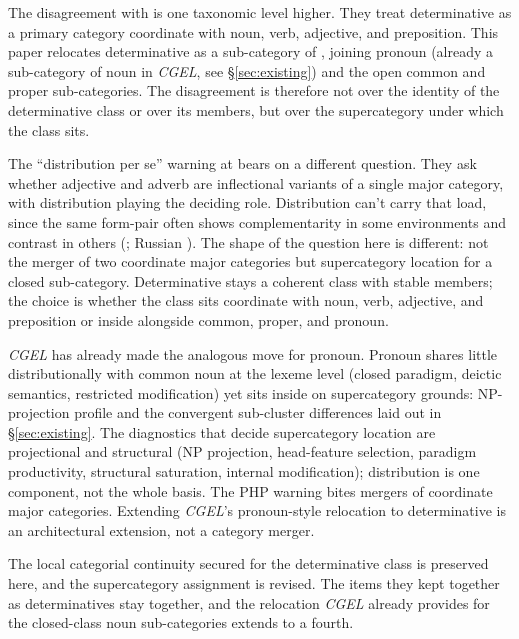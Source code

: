 \documentclass[12pt]{article}
\begin{document}
The disagreement with \textcite{payne2010} is one taxonomic level higher. They treat determinative as a primary category coordinate with noun, verb, adjective, and preposition. This paper relocates determinative as a sub-category of , joining pronoun (already a sub-category of noun in \textit{CGEL}, see §\ref{sec:existing}) and the open common and proper sub-categories. The disagreement is therefore not over the identity of the determinative class or over its members, but over the supercategory under which the class sits.

The \enquote{distribution per se} warning at \textcite[§10]{payne2010} bears on a different question. They ask whether adjective and adverb are inflectional variants of a single major category, with distribution playing the deciding role. Distribution can't carry that load, since the same form-pair often shows complementarity in some environments and contrast in others (; Russian ). The shape of the question here is different: not the merger of two coordinate major categories but supercategory location for a closed sub-category. Determinative stays a coherent class with stable members; the choice is whether the class sits coordinate with noun, verb, adjective, and preposition or inside  alongside common, proper, and pronoun.

\textit{CGEL} has already made the analogous move for pronoun. Pronoun shares little distributionally with common noun at the lexeme level (closed paradigm, deictic semantics, restricted modification) yet sits inside  on supercategory grounds: NP-projection profile and the convergent sub-cluster differences laid out in §\ref{sec:existing}. The diagnostics that decide supercategory location are projectional and structural (NP projection, head-feature selection, paradigm productivity, structural saturation, internal modification); distribution is one component, not the whole basis. The PHP warning bites mergers of coordinate major categories. Extending \textit{CGEL}'s pronoun-style relocation to determinative is an architectural extension, not a category merger.

The local categorial continuity \textcite{payne2010} secured for the determinative class is preserved here, and the supercategory assignment is revised. The items they kept together as determinatives stay together, and the relocation \textit{CGEL} already provides for the closed-class noun sub-categories extends to a fourth.
\end{document}
